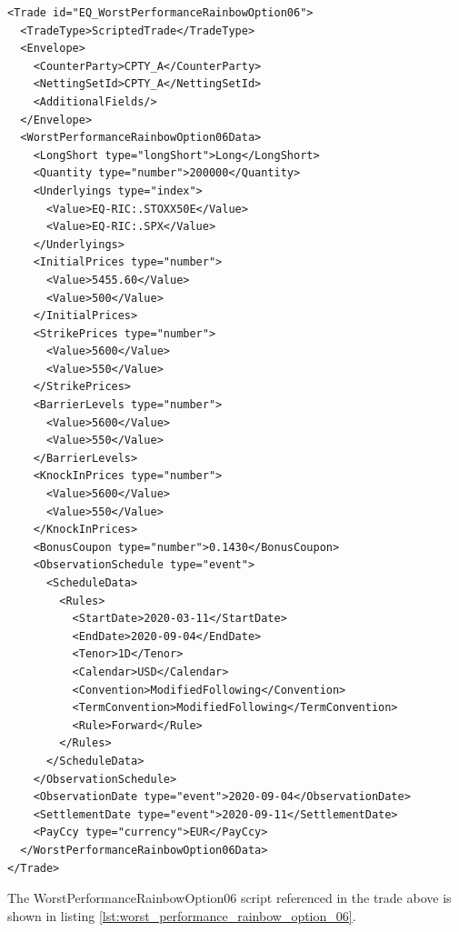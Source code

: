 \begin{verbatim}
<Trade id="EQ_WorstPerformanceRainbowOption06">
  <TradeType>ScriptedTrade</TradeType>
  <Envelope>
    <CounterParty>CPTY_A</CounterParty>
    <NettingSetId>CPTY_A</NettingSetId>
    <AdditionalFields/>
  </Envelope>
  <WorstPerformanceRainbowOption06Data>
    <LongShort type="longShort">Long</LongShort>
    <Quantity type="number">200000</Quantity>
    <Underlyings type="index">
      <Value>EQ-RIC:.STOXX50E</Value>
      <Value>EQ-RIC:.SPX</Value>
    </Underlyings>
    <InitialPrices type="number">
      <Value>5455.60</Value>
      <Value>500</Value>
    </InitialPrices>
    <StrikePrices type="number">
      <Value>5600</Value>
      <Value>550</Value>
    </StrikePrices>
    <BarrierLevels type="number">
      <Value>5600</Value>
      <Value>550</Value>
    </BarrierLevels>
    <KnockInPrices type="number">
      <Value>5600</Value>
      <Value>550</Value>
    </KnockInPrices>
    <BonusCoupon type="number">0.1430</BonusCoupon>
    <ObservationSchedule type="event">
      <ScheduleData>
        <Rules>
          <StartDate>2020-03-11</StartDate>
          <EndDate>2020-09-04</EndDate>
          <Tenor>1D</Tenor>
          <Calendar>USD</Calendar>
          <Convention>ModifiedFollowing</Convention>
          <TermConvention>ModifiedFollowing</TermConvention>
          <Rule>Forward</Rule>
        </Rules>
      </ScheduleData>
    </ObservationSchedule>
    <ObservationDate type="event">2020-09-04</ObservationDate>
    <SettlementDate type="event">2020-09-11</SettlementDate>
    <PayCcy type="currency">EUR</PayCcy>
  </WorstPerformanceRainbowOption06Data>
</Trade>
\end{verbatim}

The WorstPerformanceRainbowOption06 script referenced in the trade above is shown in listing
\ref{lst:worst_performance_rainbow_option_06}.

